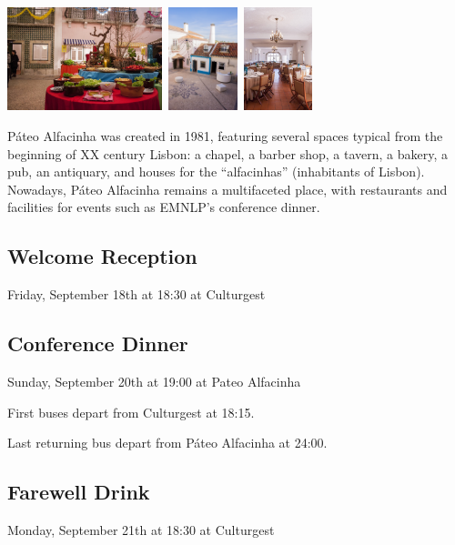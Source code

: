 \begin{center}
\includegraphics[height=3cm]{content/images/dinner-pateo-jantar-arraial}\ \includegraphics[height=3cm]{content/images/dinner-pateo-exterior}\ \includegraphics[height=3cm]{content/images/dinner-pateo-sala}
\par\end{center}

Páteo Alfacinha was created in 1981, featuring several spaces typical
from the beginning of XX century Lisbon: a chapel, a barber shop,
a tavern, a bakery, a pub, an antiquary, and houses for the “alfacinhas”
(inhabitants of Lisbon). Nowadays, Páteo Alfacinha remains a multifaceted
place, with restaurants and facilities for events such as EMNLP's
conference dinner.


\subsection*{Welcome Reception}

Friday, September 18th at 18:30 at Culturgest


\subsection*{Conference Dinner}

Sunday, September 20th at 19:00 at Pateo Alfacinha

First buses depart from Culturgest at 18:15. 

Last returning bus depart from Páteo Alfacinha at 24:00.


\subsection*{Farewell Drink}

Monday, September 21th at 18:30 at Culturgest
